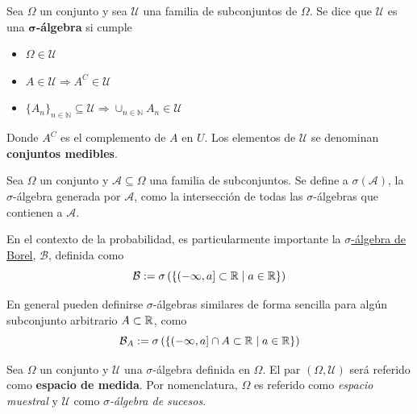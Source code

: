 \begin{definicion}%
Sea $\Omega$ un conjunto y sea $\mathcal{U}$ una familia de subconjuntos de $\Omega$. Se dice que $\mathcal{U}$ es una \textbf{$\boldsymbol{\sigma}$-álgebra} si cumple
\begin{itemize}
\item $\Omega \in \mathcal{U}$
\item $A \in \mathcal{U} \Rightarrow A^{C} \in \mathcal{U}$
\item 
$ \displaystyle \{ A_n \}_{n\in \mathbb{N}} \subseteq \mathcal{U} 
\Rightarrow \cup_{n\in \mathbb{N}} A_n \in \mathcal{U}$
\end{itemize}
Donde $A^{C}$ es el complemento de $A$ en $U$. Los elementos de $\mathcal{U}$ se denominan \textbf{conjuntos medibles}. 
\end{definicion}

\begin{definicion}
Sea $\Omega$ un conjunto y $\mathcal{A} \subseteq \Omega$ una familia de subconjuntos. Se define a $\sigma(\mathcal{A})$, la $\sigma$-álgebra generada por $\mathcal{A}$, como la intersección de todas las $\sigma$-álgebras que contienen a $\mathcal{A}$.
\end{definicion}

\begin{ejemplo}
En el contexto de la probabilidad, es particularmente importante la \underline{$\sigma$-álgebra de Borel}, $\mathcal{B}$, definida como
\begin{equation}
\mathcal{B} := \sigma\left( \left\{ \left( -\infty , a \right] \subset \mathbb{R} \mathrel{}\middle|\mathrel{} a\in \mathbb{R} \right\} \right)
\end{equation}

En general pueden definirse $\sigma$-álgebras similares de forma sencilla para algún subconjunto arbitrario $A \subset \mathbb{R}$, como
\begin{equation}
\mathcal{B}_A := \sigma\left( \left\{ \left( -\infty , a \right] \cap A \subset \mathbb{R} \mathrel{}\middle|\mathrel{} a\in \mathbb{R} \right\} \right)
\end{equation}
\end{ejemplo}

\begin{definicion}
Sea $\Omega$ un conjunto y $\mathcal{U}$ una $\sigma$-álgebra definida en $\Omega$. El par $(\Omega,\mathcal{U})$ será referido como \textbf{espacio de medida}. Por nomenclatura, $\Omega$ es referido como \textit{espacio muestral} y $\mathcal{U}$ como \textit{$\sigma$-álgebra de sucesos}.
\end{definicion}

